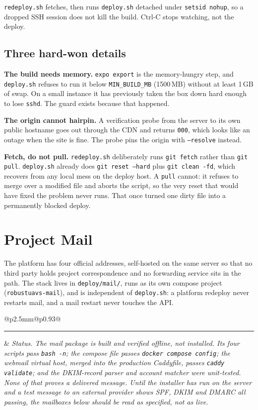 \documentclass[11pt,a4paper]{article}
\makeatletter
\newcommand{\code}[1]{\texttt{#1}}
\newcommand{\provbox}[1]{%
  \par\medskip\noindent
  \begin{tabular}{@{}p{2.5mm}@{\hspace{3mm}}p{0.93\linewidth}@{}}
  \textcolor{bridgecol}{\rule{2.5mm}{\baselineskip}} & \small\itshape #1
  \end{tabular}\par\medskip}
\makeatother
\begin{document}
\code{redeploy.sh} fetches, then runs \code{deploy.sh} detached under
\code{setsid nohup}, so a dropped SSH session does not kill the build.
Ctrl-C stops watching, not the deploy.

\subsection{Three hard-won details}
\textbf{The build needs memory.} \code{expo export} is the memory-hungry step,
and \code{deploy.sh} refuses to run it below \code{MIN\_BUILD\_MB} (1500\,MB)
without at least 1\,GB of swap. On a small instance it has previously taken the
box down hard enough to lose \code{sshd}. The guard exists because that happened.

\textbf{The origin cannot hairpin.} A verification probe from the server to its
own public hostname goes out through the CDN and returns \code{000}, which looks
like an outage when the site is fine. The probe pins the origin with
\code{--resolve} instead.

\textbf{Fetch, do not pull.} \code{redeploy.sh} deliberately runs
\code{git fetch} rather than \code{git pull}. \code{deploy.sh} already does
\code{git reset --hard} plus \code{git clean -fd}, which recovers from any local
mess on the deploy host. A \code{pull} cannot: it refuses to merge over a
modified file and aborts the script, so the very reset that would have fixed the
problem never runs. That once turned one dirty file into a permanently blocked
deploy.

\section{Project Mail}
\label{sec:mail}

The platform has four official addresses, self-hosted on the same server so
that no third party holds project correspondence and no forwarding service sits
in the path. The stack lives in \code{deploy/mail/}, runs as its own compose
project (\code{robustuavs-mail}), and is independent of \code{deploy.sh}: a
platform redeploy never restarts mail, and a mail restart never touches the API.

\provbox{Status. The mail package is \emph{built and verified offline}, not
installed. Its four scripts pass \code{bash -n}; the compose file passes
\code{docker compose config}; the webmail virtual host, merged into the
production Caddyfile, passes \code{caddy validate}; and the DKIM-record parser
and account matcher were unit-tested. None of that proves a delivered message.
Until the installer has run on the server and a test message to an external
provider shows SPF, DKIM and DMARC all passing, the mailboxes below should be
read as specified, not as live.}
\end{document}
